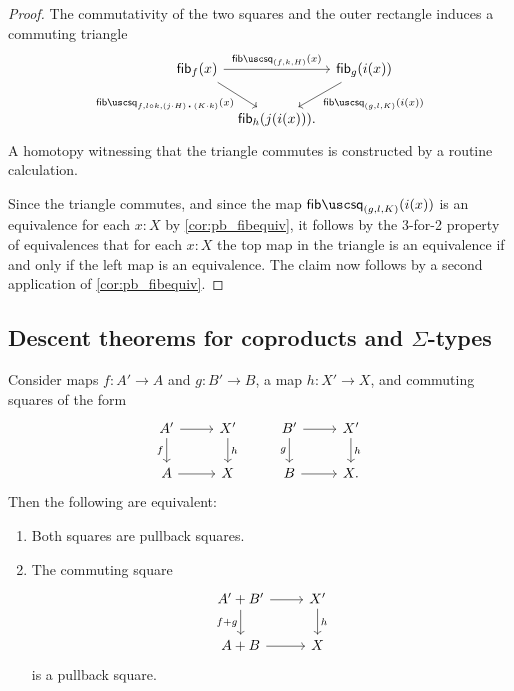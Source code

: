 \begin{proof}
The commutativity of the two squares and the outer rectangle induces a commuting triangle
\begin{equation*}
\begin{tikzcd}[column sep=tiny]
\fib{f}{x} \arrow[rr,"\fibsquare_{(f,k,H)}(x)"] \arrow[dr,swap,"\fibsquare_{f,l\circ k,\ct{(j\cdot H)}{(K\cdot k)}}(x)"] & & \fib{g}{i(x)} \arrow[dl,"\fibsquare_{(g,l,K)}(i(x))"] \\
& \fib{h}{j(i(x))}.
\end{tikzcd}
\end{equation*}
A homotopy witnessing that the triangle commutes is constructed by a routine calculation.

Since the triangle commutes, and since the map $\fibsquare_{(g,l,K)}(i(x))$ is an equivalence for each $x:X$ by \cref{cor:pb_fibequiv}, it follows
by the 3-for-2 property of equivalences that for each $x:X$ the top map in the triangle is an equivalence if and only if the left map is an equivalence.
The claim now follows by a second application of \cref{cor:pb_fibequiv}.
\end{proof}

\subsection{Descent theorems for coproducts and \texorpdfstring{$\Sigma$}{Σ}-types}

\begin{thm}\label{thm:descent-coprod}
Consider maps $f:A'\to A$ and $g:B'\to B$, a map $h:X'\to X$, and commuting squares of the form
\begin{equation*}
\begin{tikzcd}
A' \arrow[r] \arrow[d,swap,"f"] & X' \arrow[d,"h"] & B' \arrow[r] \arrow[d,swap,"g"] & X' \arrow[d,"h"] \\
A \arrow[r] & X & B \arrow[r] & X.
\end{tikzcd}
\end{equation*}
Then the following are equivalent:
\begin{enumerate}
\item Both squares are pullback squares.
\item The commuting square 
\begin{equation*}
\begin{tikzcd}
A'+B' \arrow[d,swap,"f+g"] \arrow[r] & X' \arrow[d,"h"] \\
A+B \arrow[r] & X
\end{tikzcd}
\end{equation*}
is a pullback square.
\end{enumerate}
\end{thm}

